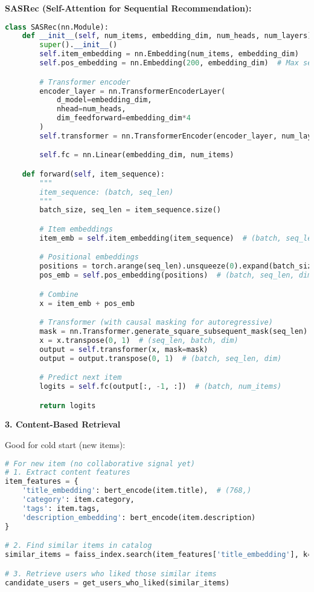 \documentclass[10pt]{article}
\begin{document}
\textbf{SASRec (Self-Attention for Sequential Recommendation):}
\begin{lstlisting}[language=Python]
class SASRec(nn.Module):
    def __init__(self, num_items, embedding_dim, num_heads, num_layers):
        super().__init__()
        self.item_embedding = nn.Embedding(num_items, embedding_dim)
        self.pos_embedding = nn.Embedding(200, embedding_dim)  # Max seq length

        # Transformer encoder
        encoder_layer = nn.TransformerEncoderLayer(
            d_model=embedding_dim,
            nhead=num_heads,
            dim_feedforward=embedding_dim*4
        )
        self.transformer = nn.TransformerEncoder(encoder_layer, num_layers)

        self.fc = nn.Linear(embedding_dim, num_items)

    def forward(self, item_sequence):
        """
        item_sequence: (batch, seq_len)
        """
        batch_size, seq_len = item_sequence.size()

        # Item embeddings
        item_emb = self.item_embedding(item_sequence)  # (batch, seq_len, dim)

        # Positional embeddings
        positions = torch.arange(seq_len).unsqueeze(0).expand(batch_size, -1).to(item_sequence.device)
        pos_emb = self.pos_embedding(positions)  # (batch, seq_len, dim)

        # Combine
        x = item_emb + pos_emb

        # Transformer (with causal masking for autoregressive)
        mask = nn.Transformer.generate_square_subsequent_mask(seq_len).to(item_sequence.device)
        x = x.transpose(0, 1)  # (seq_len, batch, dim)
        output = self.transformer(x, mask=mask)
        output = output.transpose(0, 1)  # (batch, seq_len, dim)

        # Predict next item
        logits = self.fc(output[:, -1, :])  # (batch, num_items)

        return logits
\end{lstlisting}

\textbf{3. Content-Based Retrieval}

Good for cold start (new items):
\begin{lstlisting}[language=Python]
# For new item (no collaborative signal yet)
# 1. Extract content features
item_features = {
    'title_embedding': bert_encode(item.title),  # (768,)
    'category': item.category,
    'tags': item.tags,
    'description_embedding': bert_encode(item.description)
}

# 2. Find similar items in catalog
similar_items = faiss_index.search(item_features['title_embedding'], k=100)

# 3. Retrieve users who liked those similar items
candidate_users = get_users_who_liked(similar_items)
\end{lstlisting}
\end{document}
